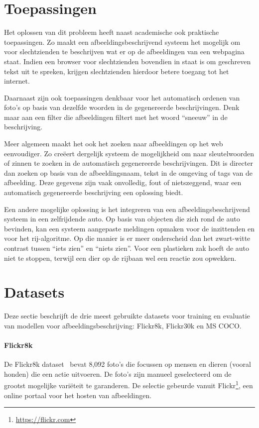 \section{Toepassingen}
Het oplossen van dit probleem heeft naast academische ook praktische toepassingen. Zo maakt een afbeeldingsbeschrijvend systeem het mogelijk om voor slechtzienden te beschrijven wat er op de afbeeldingen van een webpagina staat. Indien een browser voor slechtzienden bovendien in staat is om geschreven tekst uit te spreken, krijgen slechtzienden hierdoor betere toegang tot het internet.

Daarnaast zijn ook toepassingen denkbaar voor het automatisch ordenen van foto's op basis van dezelfde woorden in de gegenereerde beschrijvingen. Denk maar aan een filter die afbeeldingen filtert met het woord ``sneeuw'' in de beschrijving. 

Meer algemeen maakt het ook het zoeken naar afbeeldingen op het web eenvoudiger. Zo cre\"eert dergelijk systeem de mogelijkheid om naar sleutelwoorden of zinnen te zoeken in de automatisch gegenereerde beschrijvingen. Dit is directer dan zoeken op basis van de afbeeldingsnaam, tekst in de omgeving of tags van de afbeelding. Deze gegevens zijn vaak onvolledig, fout of nietszeggend, waar een automatisch gegenereerde beschrijving een oplossing biedt.

Een andere mogelijke oplossing is het integreren van een afbeeldingsbeschrijvend systeem in een zelfrijdende auto. Op basis van objecten die zich rond de auto bevinden, kan een systeem aangepaste meldingen opmaken voor de inzittenden en voor het rij-algoritme. Op die manier is er meer onderscheid dan het zwart-witte contrast tussen ``iets zien'' en ``niets zien''. Voor een plastieken zak hoeft de auto niet te stoppen, terwijl een dier op de rijbaan wel een reactie zou opwekken.


\section{Datasets}
\label{sec:Datasets}
Deze sectie beschrijft de drie meest gebruikte datasets voor training en evaluatie van modellen voor afbeeldingsbeschrijving: Flickr8k, Flickr30k en MS COCO.

\paragraph{Flickr8k}
\label{par:Flickr8k}
De Flickr8k dataset~\cite{Hodosh2013} bevat 8,092 foto's die focussen op mensen en dieren (vooral honden) die een actie uitvoeren. De foto's zijn manueel geselecteerd om de grootst mogelijke vari\"eteit te garanderen. De selectie gebeurde vanuit Flickr\footnote{\url{https://flickr.com}}, een online portaal voor het hosten van afbeeldingen.

